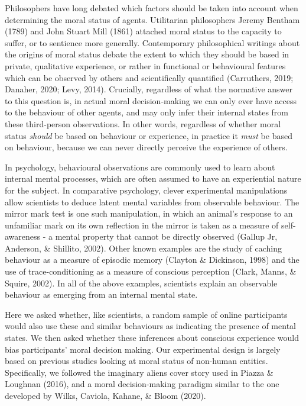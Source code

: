 \documentclass[10pt, letterpaper]{article}
\begin{document}
Philosophers have long debated which factors should be taken into
account when determining the moral status of agents. Utilitarian
philosophers Jeremy Bentham (1789) and John Stuart Mill (1861) attached
moral status to the capacity to suffer, or to sentience more generally.
Contemporary philosophical writings about the origins of moral status
debate the extent to which they should be based in private, qualitative
experience, or rather in functional or behavioural features which can be
observed by others and scientifically quantified (Carruthers, 2019;
Danaher, 2020; Levy, 2014). Crucially, regardless of what the normative
answer to this question is, in actual moral decision-making we can only
ever have access to the behaviour of other agents, and may only infer
their internal states from these third-person observations. In other
words, regardless of whether moral status \emph{should} be based on
behaviour or experience, in practice it \emph{must} be based on
behaviour, because we can never directly perceive the experience of
others.

In psychology, behavioural observations are commonly used to learn about
internal mental processes, which are often assumed to have an
experiential nature for the subject. In comparative psychology, clever
experimental manipulations allow scientists to deduce latent mental
variables from observable behaviour. The mirror mark test is one such
manipulation, in which an animal's response to an unfamiliar mark on its
own reflection in the mirror is taken as a measure of self-awareness - a
mental property that cannot be directly observed (Gallup Jr, Anderson,
\& Shillito, 2002). Other known examples are the study of caching
behaviour as a measure of episodic memory (Clayton \& Dickinson, 1998)
and the use of trace-conditioning as a measure of conscious perception
(Clark, Manns, \& Squire, 2002). In all of the above examples,
scientists explain an observable behaviour as emerging from an internal
mental state.

Here we asked whether, like scientists, a random sample of online
participants would also use these and similar behaviours as indicating
the presence of mental states. We then asked whether these inferences
about conscious experience would bias participants' moral decision
making. Our experimental design is largely based on previous studies
looking at moral status of non-human entities. Specifically, we followed
the imaginary aliens cover story used in Piazza \& Loughnan (2016), and
a moral decision-making paradigm similar to the one developed by Wilks,
Caviola, Kahane, \& Bloom (2020).
\end{document}

